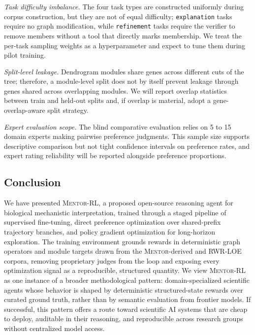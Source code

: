 \documentclass[thesis,letterpaper,12pt]{utthesis}
\begin{document}
\textit{Task difficulty imbalance.} The four task types are constructed uniformly during corpus construction, but they are not of equal difficulty; \texttt{explanation} tasks require no graph modification, while \texttt{refinement} tasks require the verifier to remove members without a tool that directly marks membership. We treat the per-task sampling weights as a hyperparameter and expect to tune them during pilot training.

\textit{Split-level leakage.} Dendrogram modules share genes across different cuts of the tree; therefore, a module-level split does not by itself prevent leakage through genes shared across overlapping modules. We will report overlap statistics between train and held-out splits and, if overlap is material, adopt a gene-overlap-aware split strategy.

\textit{Expert evaluation scope.} The blind comparative evaluation relies on 5 to 15 domain experts making pairwise preference judgments. This sample size supports descriptive comparison but not tight confidence intervals on preference rates, and expert rating reliability will be reported alongside preference proportions.

\subsection{Conclusion}
We have presented \textsc{Mentor-RL}, a proposed open-source reasoning agent for biological mechanistic interpretation, trained through a staged pipeline of supervised fine-tuning, direct preference optimization over shared-prefix trajectory branches, and policy gradient optimization for long-horizon exploration. The training environment grounds rewards in deterministic graph operators and module targets drawn from the \textsc{Mentor}-derived and RWR-LOE corpora, removing proprietary judges from the loop and exposing every optimization signal as a reproducible, structured quantity. We view \textsc{Mentor-RL} as one instance of a broader methodological pattern: domain-specialized scientific agents whose behavior is shaped by deterministic structured-state rewards over curated ground truth, rather than by semantic evaluation from frontier models. If successful, this pattern offers a route toward scientific AI systems that are cheap to deploy, auditable in their reasoning, and reproducible across research groups without centralized model access.

\printbibliography
\end{document}
